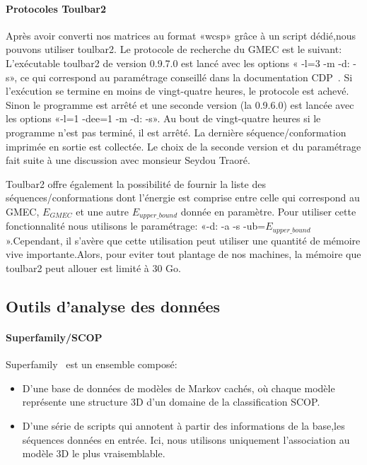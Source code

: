    \paragraph{Protocoles Toulbar2} 
\label{proto_toulbar2}

Après avoir converti nos matrices au format «wcsp» grâce à un script dédié,nous pouvons utiliser toulbar2.
Le protocole de recherche du GMEC est le suivant:
L'exécutable toulbar2 de version 0.9.7.0 est lancé avec les options « -l=3 -m -d: -s», ce qui correspond au paramétrage conseillé dans la documentation CDP~\citep{reftoulbar1,reftoulbar2}. Si l'exécution se termine en moins de vingt-quatre heures, le protocole est achevé. Sinon le programme est arrêté et une seconde version (la 0.9.6.0) est lancée avec les options «-l=1 -dee=1 -m -d: -s». Au bout de vingt-quatre heures si le programme n'est pas terminé, il est arrêté. La dernière séquence/conformation imprimée en sortie est collectée. Le choix de la seconde version et du paramétrage fait suite à une discussion avec monsieur Seydou Traoré.  

Toulbar2 offre également la possibilité de fournir la liste des séquences/conformations dont l'énergie est comprise entre celle qui correspond au GMEC, $E_{GMEC}$ et une autre $E_{upper\_bound}$ donnée en paramètre. Pour utiliser cette fonctionnalité nous utilisons le paramétrage:  «-d: -a -s -ub=$E_{upper\_bound}$ ».Cependant, il s'avère que cette utilisation peut utiliser une quantité de mémoire vive importante.Alors, pour eviter tout plantage de nos machines, la mémoire que toulbar2 peut allouer est limité à 30 Go.

\subsection{Outils d'analyse des données} 
   \paragraph{Superfamily/SCOP} 

Superfamily~\citep{refSuperfamily} est un ensemble composé: 

\begin{itemize}
\item D'une base de données de modèles de Markov cachés, où chaque modèle représente une structure 3D d'un domaine de la classification SCOP.
\item D'une série de scripts qui annotent à partir des informations de la base,les séquences données en entrée. Ici, nous utilisons uniquement l'association au modèle 3D le plus vraisemblable. 
\end{itemize}

